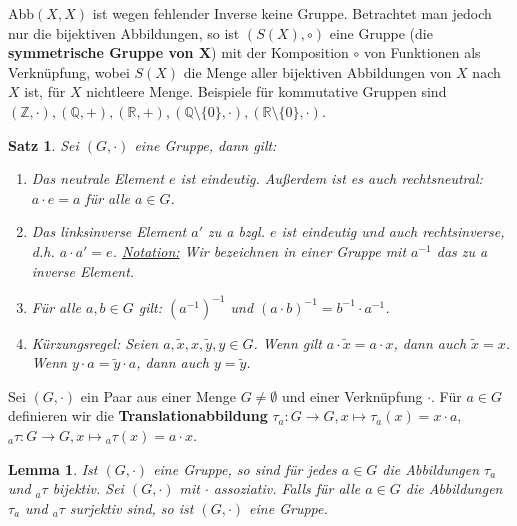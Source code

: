 \documentclass[12pt,a4paper]{article}
\theoremstyle{plain}
\newtheorem{Satz}[Theorem]{Satz}
\newtheorem{Lemma}[Theorem]{Lemma}
\newcommand{\R}{\mathbb{R}}
\newcommand{\Z}{\mathbb{Z}}
\newcommand{\Q}{\mathbb{Q}}
\numberwithin{equation}{section}
\begin{document}
Abb$(X,X)$ ist wegen fehlender Inverse keine Gruppe. Betrachtet man jedoch nur die bijektiven Abbildungen, so ist $(S(X),\circ)$ eine Gruppe (die \textbf{symmetrische Gruppe von $\mathbf{X}$}) mit der Komposition $\circ$ von Funktionen als Verknüpfung, wobei $S(X)$ die Menge aller bijektiven Abbildungen von $X$ nach $X$ ist, für $X$ nichtleere Menge. Beispiele für kommutative Gruppen sind $(\Z,\cdot), (\Q,+), (\R,+), (\Q\setminus\{0\},\cdot),(\R\setminus\{0\},\cdot)$.
\begin{Satz}
Sei $(G,\cdot)$ eine Gruppe, dann gilt:
\begin{enumerate}
\renewcommand{\labelenumi}{\emph{(\alph{enumi})}}
\item Das neutrale Element $e$ ist eindeutig. Außerdem ist es auch rechtsneutral: $a\cdot e=a$ für alle $a\in G$.
\item Das linksinverse Element $a'$ zu a bzgl. $e$ ist eindeutig und auch rechtsinverse, d.h. $a\cdot a'=e$. \underline{Notation:} Wir bezeichnen in einer Gruppe mit $a^{-1}$ das zu a inverse Element.
\item Für alle $a,b\in G$ gilt: $\left(a^{-1}\right)^{-1}$ und $(a\cdot b)^{-1}=b^{-1}\cdot a^{-1}$.
\item Kürzungsregel: Seien $a,\tilde{x},x,\tilde{y},y\in G$. Wenn gilt $a\cdot \tilde{x}=a\cdot x$, dann auch $\tilde{x}=x$. Wenn $y\cdot a=\tilde{y}\cdot a$, dann auch $y=\tilde{y}$.
\end{enumerate}
\end{Satz}
Sei $(G,\cdot)$ ein Paar aus einer Menge $G\neq \emptyset$ und einer Verknüpfung $\cdot$. Für $a\in G$ definieren wir die \textbf{Translationabbildung} $\tau_a: G\rightarrow G, x\mapsto \tau_a(x)=x\cdot a$, $_a\tau: G \rightarrow G, x\mapsto {}_a\tau(x)=a\cdot x$.
\begin{Lemma}
Ist $(G,\cdot)$ eine Gruppe, so sind für jedes $a\in G$ die Abbildungen $\tau_a$ und $_a\tau$ bijektiv. Sei $(G,\cdot)$ mit $\cdot$ assoziativ. Falls für alle $a\in G$ die Abbildungen $\tau_a$ und $_a\tau$ surjektiv sind, so ist $(G,\cdot)$ eine Gruppe.
\end{Lemma}
\end{document}
